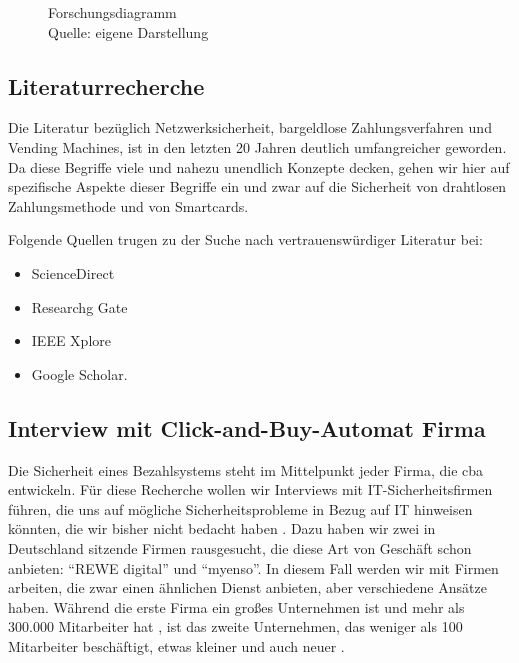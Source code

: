 \begin{figure}[H]
  \caption{Forschungsdiagramm
  \\ Quelle: eigene Darstellung}
  \label{fig:FD}
\end{figure}


\subsection{Literaturrecherche}

Die Literatur bezüglich Netzwerksicherheit, bargeldlose Zahlungsverfahren und Vending Machines, ist in den letzten 20 
Jahren deutlich umfangreicher geworden. Da diese Begriffe viele und nahezu unendlich Konzepte decken, gehen wir hier
auf spezifische Aspekte dieser Begriffe ein und zwar auf die Sicherheit von drahtlosen Zahlungsmethode und von 
Smartcards. 

Folgende Quellen trugen zu der Suche nach vertrauenswürdiger Literatur bei:

\begin{itemize}
    \item ScienceDirect
    \item Researchg Gate
    \item IEEE Xplore
    \item Google Scholar.
\end{itemize}


\subsection{Interview mit Click-and-Buy-Automat Firma}

Die Sicherheit eines Bezahlsystems steht im Mittelpunkt jeder Firma, die \acrfull{cba} entwickeln. Für diese Recherche 
wollen wir Interviews mit IT-Sicherheitsfirmen führen, die uns auf mögliche Sicherheitsprobleme in Bezug auf IT hinweisen
könnten, die wir bisher nicht bedacht haben \cite{refbook:FWDL}. Dazu haben wir zwei in Deutschland sitzende Firmen rausgesucht, 
die diese Art von Geschäft schon anbieten: ``REWE digital'' und ``myenso''. In diesem Fall werden wir mit Firmen arbeiten, die zwar
einen ähnlichen Dienst anbieten, aber verschiedene Ansätze haben. Während die erste Firma ein großes Unternehmen ist und mehr als
300.000 Mitarbeiter hat \cite{refst:REWE}, ist das zweite Unternehmen, das weniger als 100 Mitarbeiter beschäftigt, etwas kleiner
und auch neuer \cite{refst:MYENSO}.

